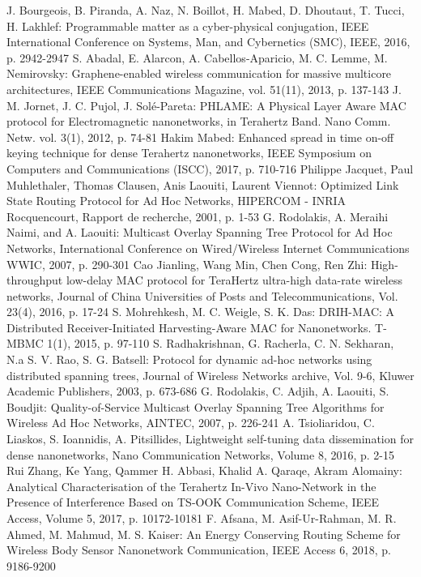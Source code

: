 \documentclass[letterpaper, 10 pt, conference]{ieeeconf}
\begin{document}
\begin{thebibliography}{1}
J. Bourgeois, B. Piranda, A. Naz, N. Boillot, H. Mabed, D. Dhoutaut, T. Tucci, H. Lakhlef: Programmable matter as a cyber-physical conjugation, IEEE International Conference on Systems, Man, and Cybernetics (SMC), IEEE, 2016, p. 2942-2947 
S. Abadal, E. Alarcon, A. Cabellos-Aparicio, M. C. Lemme, M. Nemirovsky:
Graphene-enabled wireless communication for massive multicore architectures, IEEE Communications Magazine, vol. 51(11), 2013, p. 137-143
J. M. Jornet, J. C. Pujol, J. Solé-Pareta: PHLAME: A Physical Layer Aware MAC protocol for Electromagnetic nanonetworks, in Terahertz Band. Nano Comm. Netw. vol. 3(1), 2012, p. 74-81
Hakim Mabed: Enhanced spread in time on-off keying technique for dense Terahertz nanonetworks, IEEE Symposium on Computers and Communications (ISCC), 2017, p. 710-716
Philippe Jacquet, Paul Muhlethaler, Thomas Clausen, Anis Laouiti, Laurent Viennot: Optimized Link State Routing Protocol for Ad Hoc Networks, HIPERCOM - INRIA Rocquencourt, Rapport de recherche,‎ 2001, p. 1-53
G. Rodolakis, A. Meraihi Naimi, and A.  Laouiti: Multicast Overlay Spanning Tree Protocol for Ad Hoc Networks, International Conference on Wired/Wireless Internet Communications WWIC, 2007, p. 290-301
Cao Jianling, Wang Min, Chen Cong, Ren Zhi: High-throughput low-delay MAC protocol for TeraHertz ultra-high data-rate wireless networks, Journal of China Universities of Posts and Telecommunications, Vol. 23(4), 2016, p. 17-24
S. Mohrehkesh, M. C. Weigle, S. K. Das: DRIH-MAC: A Distributed Receiver-Initiated Harvesting-Aware MAC for Nanonetworks. T-MBMC 1(1), 2015, p. 97-110
S. Radhakrishnan, G. Racherla, C. N. Sekharan, N.a S. V. Rao, S. G. Batsell: Protocol for dynamic ad-hoc networks using distributed spanning trees,  Journal of Wireless Networks archive, Vol. 9-6, Kluwer Academic Publishers, 2003, p. 673-686
G. Rodolakis, C. Adjih, A. Laouiti, S. Boudjit: Quality-of-Service Multicast Overlay Spanning Tree Algorithms for Wireless Ad Hoc Networks, AINTEC, 2007, p. 226-241
A. Tsioliaridou, C. Liaskos, S. Ioannidis, A. Pitsillides, Lightweight self-tuning data dissemination for dense nanonetworks, Nano Communication Networks, Volume 8, 2016, p. 2-15
Rui Zhang, Ke Yang, Qammer H. Abbasi, Khalid A. Qaraqe, Akram Alomainy: Analytical Characterisation of the Terahertz In-Vivo Nano-Network in the Presence of Interference Based on TS-OOK Communication Scheme, IEEE Access, Volume 5, 2017, p. 10172-10181
F. Afsana, M. Asif-Ur-Rahman, M. R. Ahmed, M. Mahmud, M. S. Kaiser: An Energy Conserving Routing Scheme for Wireless Body Sensor Nanonetwork Communication, IEEE Access 6, 2018, p. 9186-9200
\end{thebibliography}
\end{document}
